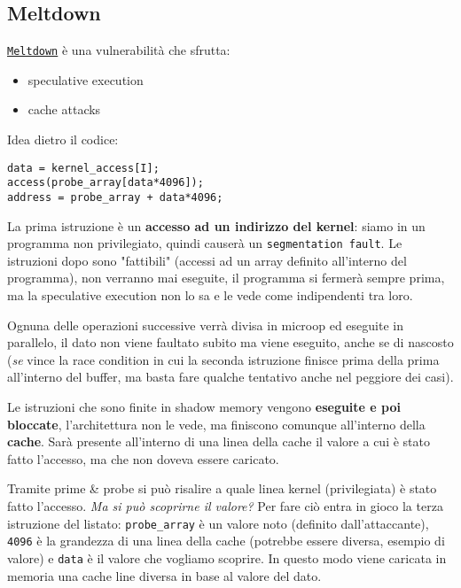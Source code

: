 \subsection{Meltdown}

\href{https://meltdownattack.com/meltdown.pdf}{\texttt{Meltdown}} è una vulnerabilità che sfrutta:
\begin{itemize}
	\item speculative execution
	
    \item cache attacks
\end{itemize}

Idea dietro il codice:
\begin{verbatim}
data = kernel_access[I];
access(probe_array[data*4096]);
address = probe_array + data*4096;
\end{verbatim}

La prima istruzione è un \textbf{accesso ad un indirizzo del kernel}: siamo in un programma non privilegiato, quindi causerà un \texttt{segmentation fault}. Le istruzioni dopo sono "fattibili" (accessi ad un array definito all'interno del programma), non verranno mai eseguite, il programma si fermerà sempre prima, ma la speculative execution non lo sa e le vede come indipendenti tra loro. 

Ognuna delle operazioni successive verrà divisa in microop ed eseguite in parallelo, il dato non viene faultato subito ma viene eseguito, anche se di nascosto (\textit{se} vince la race condition in cui la seconda istruzione finisce prima della prima all'interno del buffer, ma basta fare qualche tentativo anche nel peggiore dei casi).

Le istruzioni che sono finite in shadow memory vengono \textbf{eseguite e poi bloccate}, l'architettura non le vede, ma finiscono comunque all'interno della \textbf{cache}. Sarà presente all'interno di una linea della cache il valore a cui è stato fatto l'accesso, ma che non doveva essere caricato.

Tramite prime \& probe si può risalire a quale linea kernel (privilegiata) è stato fatto l'accesso. \textit{Ma si può scoprirne il valore?} Per fare ciò entra in gioco la terza istruzione del listato: \texttt{probe\_array} è un valore noto (definito dall'attaccante), \texttt{4096} è la grandezza di una linea della cache (potrebbe essere diversa, esempio di valore) e \texttt{data} è il valore che vogliamo scoprire. In questo modo viene caricata in memoria una cache line diversa in base al valore del dato.

